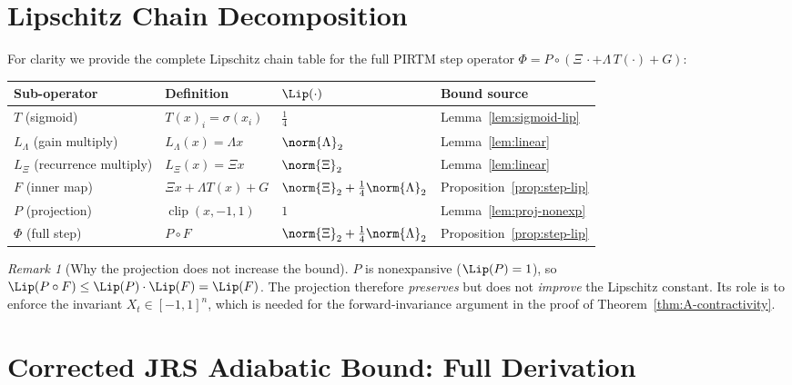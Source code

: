 \documentclass[11pt,letterpaper]{article}
\theoremstyle{pirtmthm}
\theoremstyle{remark}
\newtheorem{remark}{Remark}[section]
\begin{document}
\section{Lipschitz Chain Decomposition}
\label{sec:lipchain}

For clarity we provide the complete Lipschitz chain table for the
full PIRTM step operator $\Phi = P \circ (\Xi\, \cdot + \Lambda\, T(\cdot) + G)$:

\begin{center}
\renewcommand{\arraystretch}{1.4}
\begin{tabular}{llll}
\toprule
\textbf{Sub-operator} & \textbf{Definition} & $\Lip(\cdot)$ & \textbf{Bound source} \\
\midrule
$T$ (sigmoid) & $T(x)_i = \sigma(x_i)$ & $\tfrac{1}{4}$ & Lemma~\ref{lem:sigmoid-lip} \\
$L_\Lambda$ (gain multiply) & $L_\Lambda(x) = \Lambda x$ & $\norm{\Lambda}_2$ & Lemma~\ref{lem:linear} \\
$L_\Xi$ (recurrence multiply) & $L_\Xi(x) = \Xi x$ & $\norm{\Xi}_2$ & Lemma~\ref{lem:linear} \\
$F$ (inner map) & $\Xi x + \Lambda T(x) + G$ & $\norm{\Xi}_2 + \frac{1}{4}\norm{\Lambda}_2$ & Proposition~\ref{prop:step-lip} \\
$P$ (projection) & $\operatorname{clip}(x,-1,1)$ & $1$ & Lemma~\ref{lem:proj-nonexp} \\
$\Phi$ (full step) & $P \circ F$ & $\norm{\Xi}_2 + \frac{1}{4}\norm{\Lambda}_2$ & Proposition~\ref{prop:step-lip} \\
\bottomrule
\end{tabular}
\end{center}

\begin{remark}[Why the projection does not increase the bound]
$P$ is nonexpansive ($\Lip(P) = 1$), so $\Lip(P \circ F) \leq
\Lip(P) \cdot \Lip(F) = \Lip(F)$. The projection therefore
\emph{preserves} but does not \emph{improve} the Lipschitz constant.
Its role is to enforce the invariant $X_t \in [-1,1]^n$, which is
needed for the forward-invariance argument in the proof of
Theorem~\ref{thm:A-contractivity}.
\end{remark}

\section{Corrected JRS Adiabatic Bound: Full Derivation}
\label{sec:jrs}
\end{document}
